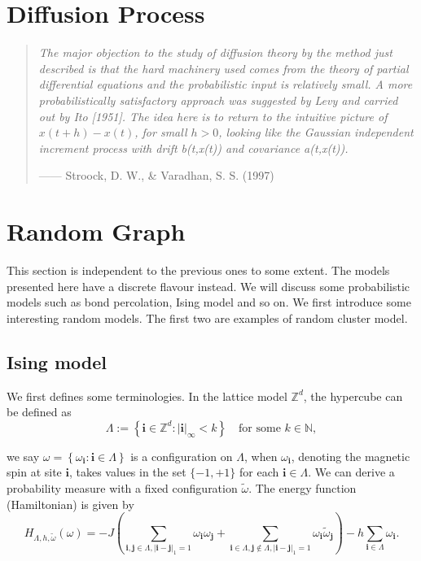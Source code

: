 \documentclass[11pt,english]{smfart}
\newcommand{\mb}{\mathbb}
\newcommand{\mf}{\mathbf}
\begin{document}
\newpage
\section{Diffusion Process}
\begin{quotation}
    \textit{The major objection to the study of diffusion theory by the method just described is that the hard machinery used comes from the theory of partial differential equations and the probabilistic input is relatively small. A more probabilistically satisfactory approach was suggested by Levy and carried out by Ito [1951]. The idea here is to return to the intuitive picture of $x(t+h) -x(t)$, for small $h>0$, looking like the Gaussian independent increment process with drift b(t,x(t)) and covariance a(t,x(t)).}\\
    \begin{flushright}------ Stroock, D. W., \& Varadhan, S. S. (1997)\end{flushright}
\end{quotation}

\newpage
\section{Random Graph}
This section is independent to the previous ones to some extent. The models presented here have a discrete flavour instead. We will discuss some probabilistic models such as bond percolation, Ising model and so on. We first introduce some interesting random models. The first two are examples of random cluster model.

\subsection{Ising model}
We first defines some terminologies. In the lattice model $\mb{Z}^d$, the hypercube can be defined as 
$$\Lambda := \left\{\mathbf{i}\in \mb{Z}^d : |\mathbf{i}|_{\infty} < k\right\}\quad \text{for some $k\in \mb{N}$},$$

we say $\omega = \left\{\omega_{\mf{i}} : \mf{i}\in \Lambda \right\}$ is a configuration on $\Lambda$, when $\omega_{\mf{i}}$, denoting the magnetic spin at site $\mf{i}$, takes values in the set $\{-1,+1\}$ for each $\mf{i}\in \Lambda$. We can derive a probability measure with a fixed configuration $\tilde{\omega}$. The energy function (Hamiltonian) is given by
$$H_{\Lambda,h,\tilde{\omega}} (\omega) = -J\left(\sum_{\mf{i,j}\in \Lambda, |\mf{i} - \mf{j}|_{1} = 1} \omega_{\mf{i}}\omega_{\mf{j}}+ \sum_{\mf{i}\in \Lambda, \mf{j}\notin \Lambda,|\mf{i} - \mf{j}|_{1} = 1} \omega_{\mf{i}}\tilde{\omega}_{\mf{j}}\right) - h \sum_{\mf{i}\in \Lambda} \omega_{\mf{i}}.$$
\end{document}
